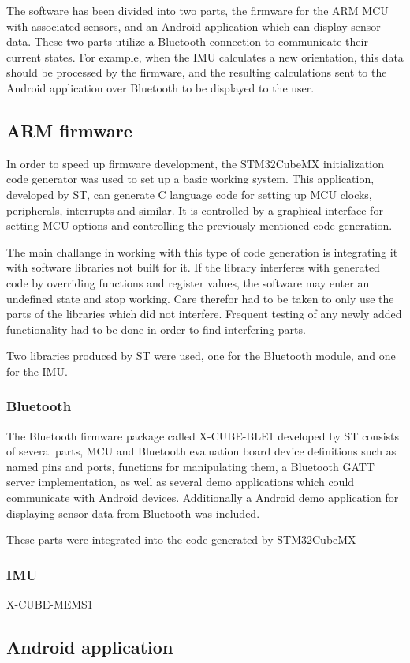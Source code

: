 The software has been divided into two parts, the firmware for the ARM MCU with associated sensors, and an Android application which can display sensor data. These two parts utilize a Bluetooth connection to communicate their current states. For example, when the IMU calculates a new orientation, this data should be processed by the firmware, and the resulting calculations sent to the Android application over Bluetooth to be displayed to the user.

\subsection{ARM firmware}
In order to speed up firmware development, the STM32CubeMX \cite{stm32cubemx} initialization code generator was used to set up a basic working system. This application, developed by ST, can generate C language code for setting up MCU clocks, peripherals, interrupts and similar. It is controlled by a graphical interface for setting MCU options and controlling the previously mentioned code generation.

The main challange in working with this type of code generation is integrating it with software libraries not built for it. If the library interferes with generated code by overriding functions and register values, the software may enter an undefined state and stop working. Care therefor had to be taken to only use the parts of the libraries which did not interfere. Frequent testing of any newly added functionality had to be done in order to find interfering parts.

Two libraries produced by ST were used, one for the Bluetooth module, and one for the IMU.
\subsubsection{Bluetooth}
The Bluetooth firmware package called X-CUBE-BLE1 \cite{x-cube-ble1} developed by ST consists of several parts, MCU and Bluetooth evaluation board device definitions such as named pins and ports, functions for manipulating them, a Bluetooth GATT server implementation, as well as several demo applications which could communicate with Android devices. Additionally a Android demo application for displaying sensor data from Bluetooth was included.

These parts were integrated into the code generated by STM32CubeMX

\subsubsection{IMU}
X-CUBE-MEMS1 \cite{x-cube-mems1}

\subsection{Android application}

